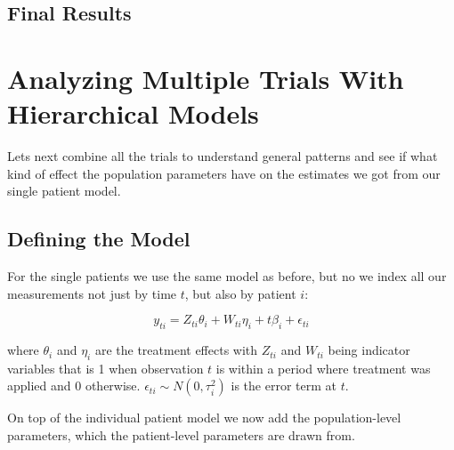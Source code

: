\documentclass[12pt,a4paper,leqno]{report}
\theoremstyle{plain}
\theoremstyle{definition}
\theoremstyle{remark}
\begin{document}

\subsection{Final Results}


\section{Analyzing Multiple Trials With Hierarchical Models}\label{pooling}

Lets next combine all the trials to understand general patterns and see if what kind of
effect the population parameters have on the estimates we got from our single patient
model.

\subsection{Defining the Model}\label{hiermodel}

For the single patients we use the same model as before, but no we index all our
measurements not just by time \(t\), but also by patient \(i\):

\begin{def}\label{simplesinglepatientmodel}
    \begin{equation}\label{}
        y_{ti} = Z_{ti}\theta_{i} + W_{ti}\eta_{i} + t\beta_{i} + \epsilon_{ti}
    \end{equation}
\end{def} where \(\theta_{i} \) and \(\eta_{i} \) are the treatment effects with \(Z_{ti}\) and \(W_{ti}\) being indicator
variables that is 1 when observation \(t\) is within a period where treatment was applied and
0 otherwise. \(\epsilon_{ti} \sim N(0,\tau_{i}^2) \) is the error term at \(t\).

On top of the individual patient model we now add the population-level parameters, which the
patient-level parameters are drawn from.

\bigskip
\end{document}
